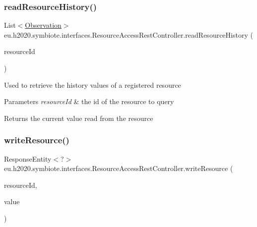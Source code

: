\subsubsection{\texorpdfstring{read\+Resource\+History()}{readResourceHistory()}}
{\footnotesize\ttfamily List$<$\hyperlink{classeu_1_1h2020_1_1symbiote_1_1model_1_1data_1_1Observation}{Observation}$>$ eu.\+h2020.\+symbiote.\+interfaces.\+Resource\+Access\+Rest\+Controller.\+read\+Resource\+History (\begin{DoxyParamCaption}\item[{@Path\+Variable String}]{resource\+Id }\end{DoxyParamCaption})}

Used to retrieve the history values of a registered resource


\begin{DoxyParams}{Parameters}
{\em resource\+Id} & the id of the resource to query \\
\hline
\end{DoxyParams}
\begin{DoxyReturn}{Returns}
the current value read from the resource 
\end{DoxyReturn}
\mbox{\label{classeu_1_1h2020_1_1symbiote_1_1interfaces_1_1ResourceAccessRestController_a46fcbc0ec97cc5d9a62f5e12f39cd8e2}} 
\subsubsection{\texorpdfstring{write\+Resource()}{writeResource()}}
{\footnotesize\ttfamily Response\+Entity$<$?$>$ eu.\+h2020.\+symbiote.\+interfaces.\+Resource\+Access\+Rest\+Controller.\+write\+Resource (\begin{DoxyParamCaption}\item[{@Path\+Variable String}]{resource\+Id,  }\item[{@Request\+Body \hyperlink{classeu_1_1h2020_1_1symbiote_1_1model_1_1data_1_1ObservationValue}{Observation\+Value}}]{value }\end{DoxyParamCaption})}

